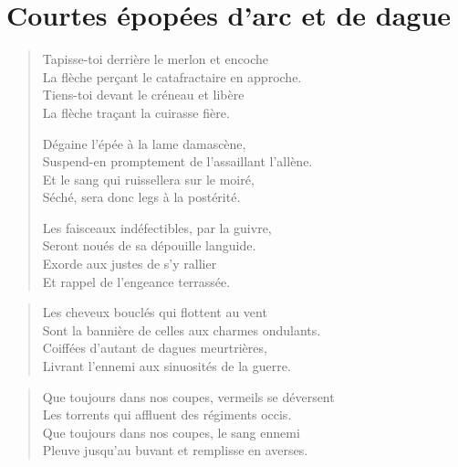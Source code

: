 \section*{Courtes épopées d’arc et de dague}
\begin{verse}%
  \quatrain%
  Tapisse-toi derrière le merlon et encoche\\  %
  La flèche perçant le catafractaire en approche.\\  %
  Tiens-toi devant le créneau et libère\\  %
  La flèche traçant la cuirasse fière.

  Dégaine l’épée à la lame damascène,\\  %
  Suspend-en promptement de l’assaillant l’allène.\\  %
  Et le sang qui ruissellera sur le moiré,\\  %
  Séché, sera donc legs à la postérité.

  Les faisceaux indéfectibles, par la guivre,\\  %
  Seront noués de sa dépouille languide.\\  %
  Exorde aux justes de s’y rallier\\  %
  Et rappel de l’engeance terrassée.
\end{verse}

\begin{verse}%
  \quatrain%
  Les cheveux bouclés qui flottent au vent\\  %
  Sont la bannière de celles aux charmes ondulants.\\  %
  Coiffées d’autant de dagues meurtrières,\\  %
  Livrant l’ennemi aux sinuosités de la guerre.
\end{verse}

\begin{verse}%
  \quatrain%
  Que toujours dans nos coupes, vermeils se déversent\\  %
  Les torrents qui affluent des régiments occis.\\  %
  Que toujours dans nos coupes, le sang ennemi\\  %
  Pleuve jusqu’au buvant et remplisse en averses.
\end{verse}



